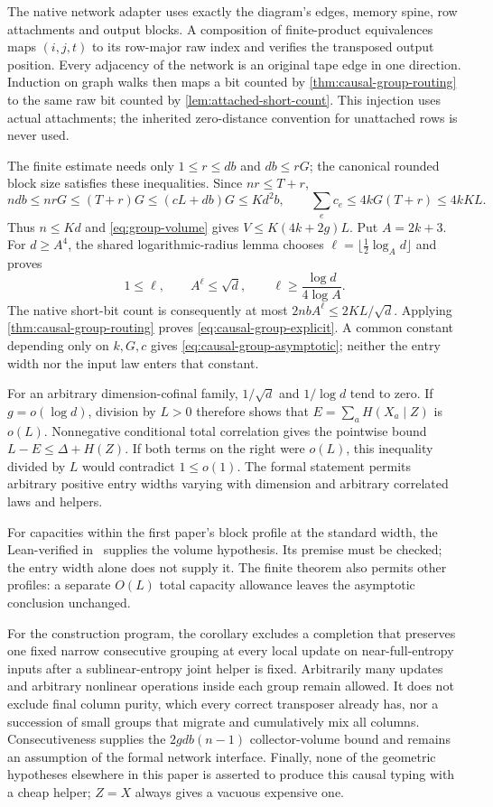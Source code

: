 \begin{outline}
The native network adapter uses exactly the diagram's edges, memory
spine, row attachments and output blocks. A composition of finite-product
equivalences maps $(i,j,t)$ to its row-major raw index and verifies the
transposed output position. Every adjacency of the network is an original
tape edge in one direction. Induction on graph walks then maps a bit
counted by \cref{thm:causal-group-routing} to the same raw bit counted by
\cref{lem:attached-short-count}. This injection uses actual attachments;
the inherited zero-distance convention for unattached rows is never used.

The finite estimate needs only $1\le r\le db$ and $db\le rG$;
the canonical rounded block size satisfies these inequalities. Since
$nr\le T+r$,
\[
 ndb\le nrG\le(T+r)G\le(cL+db)G\le Kd^2b,
 \qquad
 \sum_e c_e\le4kG(T+r)\le4kKL.
\]
Thus $n\le Kd$ and \cref{eq:group-volume} gives
$V\le K(4k+2g)L$.
Put $A=2k+3$. For $d\ge A^4$, the shared logarithmic-radius lemma chooses
$\ell=\lfloor\tfrac12\log_A d\rfloor$ and proves
\[
 1\le\ell,\qquad A^\ell\le\sqrt d,\qquad
 \ell\ge\frac{\log d}{4\log A}.
\]
The native short-bit count is consequently at most
$2nbA^\ell\le2KL/\sqrt d$.
Applying \cref{thm:causal-group-routing} proves
\cref{eq:causal-group-explicit}. A common constant depending only on
$k,G,c$ gives \cref{eq:causal-group-asymptotic}; neither the entry width
nor the input law enters that constant.

For an arbitrary dimension-cofinal family, $1/\sqrt d$ and $1/\log d$
tend to zero. If $g=o(\log d)$, division by $L>0$ therefore shows that
$E=\sum_a H(X_a\mid Z)$ is $o(L)$. Nonnegative conditional total
correlation gives the pointwise bound
$L-E\le\Delta+H(Z)$. If both terms on the right were $o(L)$, this
inequality divided by $L$ would contradict $1\le o(1)$.
The formal statement permits arbitrary positive entry widths varying
with dimension and arbitrary correlated laws and helpers.
\end{outline}

For capacities within the first paper's block profile at the standard
width, the Lean-verified  in~\cite{FirstPaper2026}
supplies the volume hypothesis. Its  premise must be
checked; the entry width alone does not supply it.
The finite theorem also
permits other profiles: a separate $O(L)$ total capacity allowance
leaves the asymptotic conclusion unchanged.

For the construction program, the corollary excludes a completion that
preserves one fixed narrow consecutive grouping at every local update
on near-full-entropy inputs after a sublinear-entropy joint helper is
fixed. Arbitrarily many
updates and arbitrary nonlinear operations inside each group remain
allowed.  It does not exclude final column purity, which every correct
transposer already has, nor a succession of small groups that migrate
and cumulatively mix all columns. Consecutiveness supplies the
$2gdb(n-1)$ collector-volume bound and remains an assumption of the
formal network interface. Finally, none of the geometric
hypotheses elsewhere in this paper is asserted to produce this causal
typing with a cheap helper; $Z=X$ always gives a vacuous expensive one.
